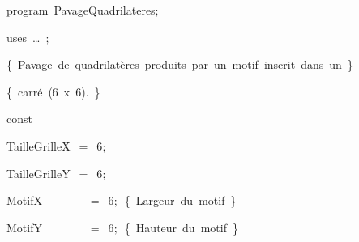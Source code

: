 
{
\parindent {}
\medskip

\carrenoir
\vspace{\neglskip}\mbox{\blc  \idt  \mcl program\idt \ PavageQuadrilateres$;$
}\par 
\vspace{\neglskip}\mbox{\blc \blk\idt \mcl uses\idt \ \ldots\ $;$
}\par 
\medskip

\vspace{\neglskip}\mbox{\blc  \blk\idt  \cmt  \{\ Pavage\ de\ quadrilatères\ produits\ par\ un\ motif\ inscrit\ dans\ un\ \}\idt }\par 
\vspace{\neglskip}\mbox{\blc  \blk\idt  \cmt  \{\ carré\ (6\ x\ 6).\ \}\idt }\par 
\medskip

\pagebreak[3] 
\vspace{\neglskip}\mbox{\blc  \blk\idt  \mcl const\idt }\par 
\vspace{\neglskip}\mbox{\blc  \blk\blk\idt  TailleGrilleX\ $=$\ 6$;$}\par 
\vspace{\neglskip}\mbox{\blc  \blk\blk\idt  TailleGrilleY\ $=$\ 6$;$}\par 
\vspace{\neglskip}\mbox{\blc  \blk\blk\idt  MotifX\ \ \ \ \ \ \ \ $=$\ 6$;$\ \cmt  \{\ Largeur\ du\ motif\ \}\idt }\par 
\vspace{\neglskip}\mbox{\blc  \blk\blk\idt  MotifY\ \ \ \ \ \ \ \ $=$\ 6$;$\ \cmt  \{\ Hauteur\ du\ motif\ \}\idt }\par 
\medskip

}
